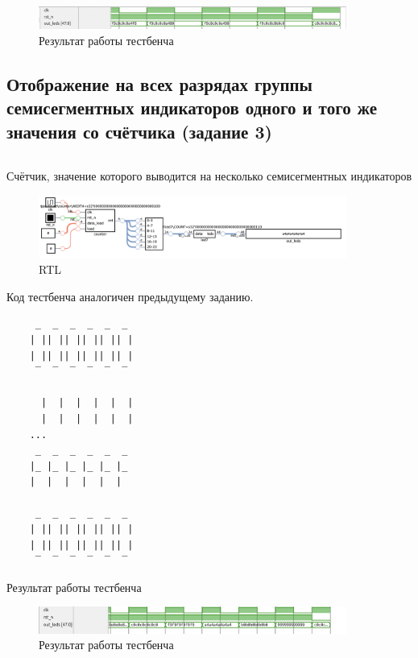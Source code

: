 \documentclass[a4paper]{article}
\begin{document}
  \begin{figure}[H]
    \centering
    \includegraphics[width=0.9\textwidth]{lab_324}
    \caption{Результат работы тестбенча}
  \end{figure}

  \subsection{Отображение на всех разрядах группы семисегментных индикаторов одного и того же значения со счётчика (задание 3)}

  \begin{listing}[H]
    \inputminted{verilog}{../chapter_6/extra/3/task3.v}
    \caption{Счётчик, значение которого выводится на несколько семисегментных индикаторов}
  \end{listing}

  \begin{figure}[H]
    \centering
    \includegraphics[width=0.9\textwidth]{lab_325.png}
    \caption{RTL}
  \end{figure}

  Код тестбенча аналогичен предыдущему заданию.

  \begin{listing}[H]
    \begin{verbatim}
     _  _  _  _  _  _ 
    | || || || || || |
    | || || || || || |
     ‾  ‾  ‾  ‾  ‾  ‾ 
                      
      |  |  |  |  |  |
      |  |  |  |  |  |
    ...
     _  _  _  _  _  _ 
    |_ |_ |_ |_ |_ |_ 
    |  |  |  |  |  |  
               
     _  _  _  _  _  _ 
    | || || || || || |
    | || || || || || |
     ‾  ‾  ‾  ‾  ‾  ‾ 
    \end{verbatim}
    \caption{Результат работы тестбенча}
  \end{listing}

  \begin{figure}[H]
    \centering
    \includegraphics[width=0.9\textwidth]{lab_326}
    \caption{Результат работы тестбенча}
  \end{figure}
\end{document}

